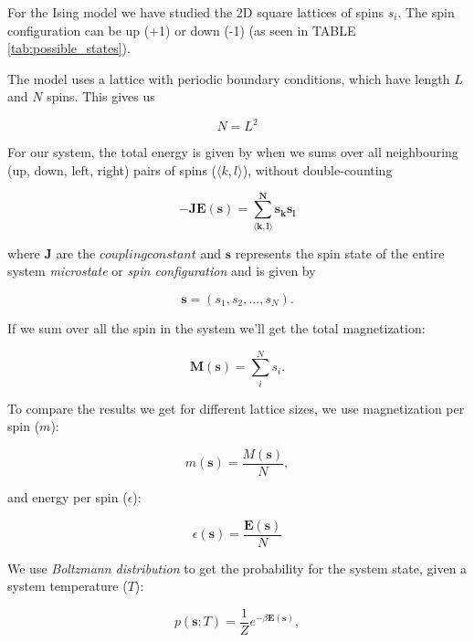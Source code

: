 \documentclass[english,notitlepage,reprint,nofootinbib]{revtex4-1}  %
\begin{document}
For the Ising model we have studied the 2D square lattices of spins $s_i$. The spin configuration can be up (+1) or down (-1) (as seen in TABLE \ref{tab:possible_states}).

The model uses a lattice with periodic boundary conditions, which have length $L$ and $N$ spins. This gives us

\begin{equation}
    N = L^2
\end{equation}

For our system, the total energy is given by when we sums over all neighbouring (up, down, left, right) pairs of spins ($\langle k,l\rangle $), without double-counting

\begin{equation} \label{eq:tot_energy}
    \mathbf{- J E(\mathbf{s}) = \sum\limits_{\langle k,l\rangle}^Ns_ks_l}
\end{equation}

where $\mathbf{J}$ are the $\mathit{coupling constant}$ and $\mathbf{s}$ represents the spin state of the entire system \textit{microstate} or \textit{spin configuration} and is given by 

\begin{equation}
    \mathbf{s} = \left( s_1, s_2, ... , s_N \right).
\end{equation}

If we sum over all the spin in the system we'll get the total magnetization:

\begin{equation}
    \mathbf{M} (\mathbf{s}) = \sum\limits_i^N s_i.
\end{equation}

To compare the results we get for different lattice sizes, we use magnetization per spin ($m$): 

\begin{equation}
    m (\mathbf{s}) = \frac{M(\mathbf{s})}{N},
\end{equation}

and energy per spin ($\epsilon$):

\begin{equation}
    \epsilon (\mathbf{s}) = \frac{\mathbf{E}(\mathbf{s})}{N}
\end{equation}

We use \textit{Boltzmann distribution} to get the probability for the system state, given a system temperature ($T$):

\begin{equation}
    p(\mathbf{s} ; T) = \frac{1}{Z} e^{- \beta \mathbf{E}(\mathbf{s})},
\end{equation}
\end{document}
